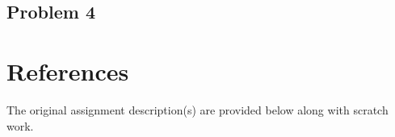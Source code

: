 \documentclass[11pt]{article}
\begin{document}
\subsection{Problem 4}



\section{References}

\noindent The original assignment description(s) are provided below along with scratch work.


\end{document}
